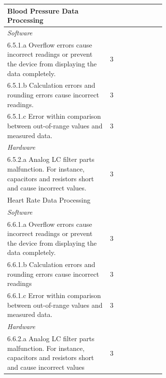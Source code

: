 \documentclass{article}
\begin{document}
\begin{longtable}{|p{0.65\linewidth}|l|}
Blood Pressure Data Processing                                     &                     \\
\hline
\textit{Software}                                                  &                     \\
\hline
6.5.1.a Overflow errors cause incorrect readings or prevent the device from displaying the data completely.                                                 & 3                   \\
\hline
6.5.1.b Calculation errors and rounding errors cause incorrect readings.                                                                                           & 3                   \\
\hline
6.5.1.c Error within comparison between out-of-range values and measured data.                                                                                     & 3                   \\
\hline
\textit{Hardware}                                                &                     \\
\hline
6.5.2.a Analog LC filter parts malfunction. For instance, capacitors and resistors short and cause
incorrect values.                                                & 3                   \\
\hline    
\rowcolor{Gray}
Heart Rate Data Processing                                         &                     \\
\hline
\textit{Software}                                                  &                     \\
\hline
6.6.1.a Overflow errors cause incorrect readings or prevent the device from displaying the data completely.                                                      & 3                   \\
\hline
6.6.1.b Calculation errors and rounding errors cause incorrect readings                                                                                            & 3                   \\
\hline
6.6.1.c Error within comparison between out-of-range values and measured data.                                                                                     & 3                   \\
\hline
\textit{Hardware}                                                  &                     \\
\hline
6.6.2.a Analog LC filter parts malfunction. For instance, capacitors and resistors short and cause
incorrect values                                                 & 3                   \\

\end{longtable}
\end{document}
